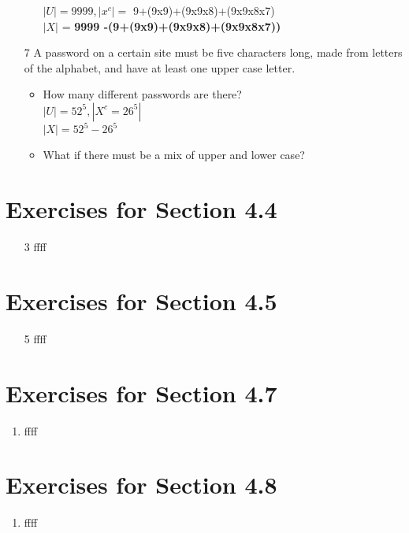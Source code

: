 \documentclass[12pt]{article}
\begin{document}
\begin{enumerate}
\begin{itemize}
		    $|U| = 9999, |x^c| =$ 9+(9x9)+(9x9x8)+(9x9x8x7)\\
		    $|X|$ = \textbf{9999 -(9+(9x9)+(9x9x8)+(9x9x8x7))}
	\end{itemize}
    \item [7] A password on a certain site must be five characters long, made from letters of the alphabet, and have at least one upper case letter.
	\begin{itemize}
	    \item How many different passwords are there?\\
		$|U| = 52^5, |X^c= 26^5|$\\
		$|X| = $\textbf{$52^5 - 26^5$}
	    \item What if there must be a mix of upper and lower case?
	\end{itemize}
\end{enumerate}
\section*{Exercises for Section 4.4}
\begin{enumerate}
    \item [3] ffff
\end{enumerate}
\section*{Exercises for Section 4.5}
\begin{enumerate}
    \item [5] ffff
\end{enumerate}
\section*{Exercises for Section 4.7}
\begin{enumerate}
    \item ffff
\end{enumerate}
\section*{Exercises for Section 4.8}
\begin{enumerate}
    \item ffff
\end{enumerate}
\end{document}
